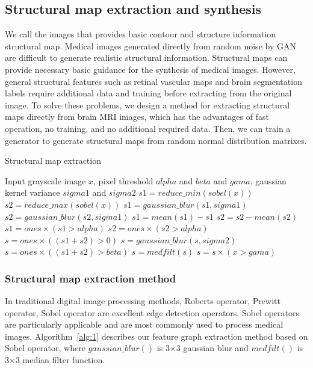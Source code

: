\documentclass[runningheads]{llncs}
\begin{document}
	\subsection{Structural map extraction and synthesis}
	We call the images that provides basic contour and structure information structural map. Medical images generated directly from random noise by GAN are difficult to generate realistic structural information. Structural maps can provide necessary basic guidance for the synthesis of medical images. However, general structural features such as retinal vascular maps\cite{41costa2017towards} and brain segmentation labels \cite{4shin2018medical}require additional data and training before extracting from the original image. To solve these problems, we design a method for extracting structural maps directly from brain MRI images, which has the advantages of fast operation, no training, and no additional required data. Then, we can train a generator to generate structural maps from random normal distribution matrixes.
	\begin{algorithm}
		\caption{Structural map extraction}
		\label{alg:1}
		\begin{multicols}{2}
			\begin{algorithmic}[1]
				\State Input grayscale image $x$,
				pixel threshold $alpha$ and $beta$ and $gama$,
				gaussian kernel variance $sigma1$ and $sigma2$
				\State $s1 = reduce\_min(sobel(x))$
				\State $s2 = reduce\_max(sobel(x))$
				\State $s1 = gaussian\_blur(s1,sigma1)$
				\State $s2 = gaussian\_blur(s2,sigma1)$
				\State $s1 = mean(s1) - s1$
				\State $s2 = s2 - mean(s2)$
				\State $s1 = ones \times (s1 > alpha)$
				\State $s2 = ones \times (s2 > alpha)$
				\State $s = ones \times ((s1 + s2)> 0)$
				\State $s = gaussian\_blur(s,sigma2)$
				\State $s = ones \times ((s1 + s2)> beta)$
				\State $s = medfilt(s)$
				\State $s = s \times (x > gama)$
			\end{algorithmic}  
		\end{multicols}
	\end{algorithm}
	\subsubsection{Structural map extraction method}
	In traditional digital image processing methods, Roberts operator\cite{145Roberts}, Prewitt operator\cite{146prewitt}, Sobel operator\cite{147Sobel} are excellent edge detection operators. Sobel operators are particularly applicable and are most commonly used to process medical images. Algorithm~\ref{alg:1} describes our feature graph extraction method based on Sobel operator, where  $gaussian\_blur()$ is 3$\times$3 gaussian blur and  $medfilt()$ is 3$\times$3 median filter function.
\end{document}
